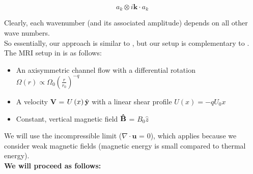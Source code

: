\documentclass[letterpaper,12pt]{article}
\begin{document}
\begin{equation}
a_k \otimes i \textbf{k} \cdot a_k
\end{equation}

\noindent Clearly, each wavenumber (and its associated amplitude) depends on all other wave numbers.\\

So essentially, our approach is similar to \citet{Umurhan:2007dz}, but our setup is complementary to \citet{Pessah:2010ic}. \\

\noindent The MRI setup in \citet{Umurhan:2007dz} is as follows: 
\begin{itemize}
\item An axisymmetric channel flow with a differential rotation ${\Omega\left(r\right) \propto \Omega_0\left(\frac{r}{r_0}\right)^{-q}}$ 
\item A velocity $\textbf{V}$ = $U\left(x\right)\hat{\bf{y}}$ with a linear shear profile $U\left(x\right) = -qU_0x$
\item Constant, vertical magnetic field $\bf{\hat{B}}$ = $B_0\hat{z}$
\end{itemize}

We will use the incompressible limit ($\nabla \cdot \textbf{u}$ = $0$), which applies because we consider weak magnetic fields (magnetic energy is small compared to thermal energy). \\

\noindent \textbf{We will proceed as follows:}
\end{document}
